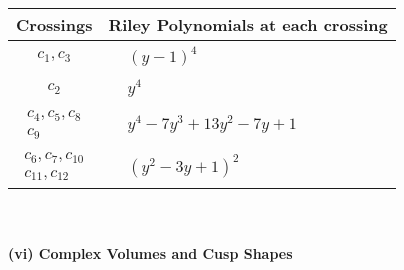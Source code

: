 \documentclass[1p]{elsarticle_modified}
\theoremstyle{definition}
\begin{document}
\begin{tabular}{m{50pt}|m{274pt}}
Crossings & \hspace{64pt}Riley Polynomials at each crossing \\
\hline $$\begin{aligned}c_{1},c_{3}\end{aligned}$$&$\begin{aligned}
&(y-1)^4
\end{aligned}$\\
\hline $$\begin{aligned}c_{2}\end{aligned}$$&$\begin{aligned}
&y^4
\end{aligned}$\\
\hline $$\begin{aligned}c_{4},c_{5},c_{8}\\c_{9}\end{aligned}$$&$\begin{aligned}
&y^4-7 y^3+13 y^2-7 y+1
\end{aligned}$\\
\hline $$\begin{aligned}c_{6},c_{7},c_{10}\\c_{11},c_{12}\end{aligned}$$&$\begin{aligned}
&(y^2-3 y+1)^2
\end{aligned}$\\
\hline
\end{tabular}\\~\\
\newpage\flushleft \textbf{(vi) Complex Volumes and Cusp Shapes}
\end{document}
